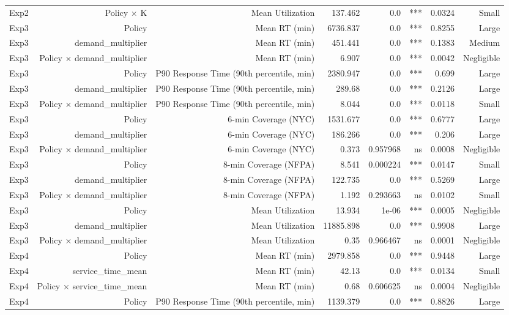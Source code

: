 \begin{table}[htbp]
\begin{tabular}{lrrrrrrr}
Exp2 & Policy × K & Mean Utilization & 137.462 & 0.0 & *** & 0.0324 & Small \\
Exp3 & Policy & Mean RT (min) & 6736.837 & 0.0 & *** & 0.8255 & Large \\
Exp3 & demand_multiplier & Mean RT (min) & 451.441 & 0.0 & *** & 0.1383 & Medium \\
Exp3 & Policy × demand_multiplier & Mean RT (min) & 6.907 & 0.0 & *** & 0.0042 & Negligible \\
Exp3 & Policy & P90 Response Time (90th percentile, min) & 2380.947 & 0.0 & *** & 0.699 & Large \\
Exp3 & demand_multiplier & P90 Response Time (90th percentile, min) & 289.68 & 0.0 & *** & 0.2126 & Large \\
Exp3 & Policy × demand_multiplier & P90 Response Time (90th percentile, min) & 8.044 & 0.0 & *** & 0.0118 & Small \\
Exp3 & Policy & 6-min Coverage (NYC) & 1531.677 & 0.0 & *** & 0.6777 & Large \\
Exp3 & demand_multiplier & 6-min Coverage (NYC) & 186.266 & 0.0 & *** & 0.206 & Large \\
Exp3 & Policy × demand_multiplier & 6-min Coverage (NYC) & 0.373 & 0.957968 & ns & 0.0008 & Negligible \\
Exp3 & Policy & 8-min Coverage (NFPA) & 8.541 & 0.000224 & *** & 0.0147 & Small \\
Exp3 & demand_multiplier & 8-min Coverage (NFPA) & 122.735 & 0.0 & *** & 0.5269 & Large \\
Exp3 & Policy × demand_multiplier & 8-min Coverage (NFPA) & 1.192 & 0.293663 & ns & 0.0102 & Small \\
Exp3 & Policy & Mean Utilization & 13.934 & 1e-06 & *** & 0.0005 & Negligible \\
Exp3 & demand_multiplier & Mean Utilization & 11885.898 & 0.0 & *** & 0.9908 & Large \\
Exp3 & Policy × demand_multiplier & Mean Utilization & 0.35 & 0.966467 & ns & 0.0001 & Negligible \\
Exp4 & Policy & Mean RT (min) & 2979.858 & 0.0 & *** & 0.9448 & Large \\
Exp4 & service_time_mean & Mean RT (min) & 42.13 & 0.0 & *** & 0.0134 & Small \\
Exp4 & Policy × service_time_mean & Mean RT (min) & 0.68 & 0.606625 & ns & 0.0004 & Negligible \\
Exp4 & Policy & P90 Response Time (90th percentile, min) & 1139.379 & 0.0 & *** & 0.8826 & Large \\

\end{tabular}
\end{table}
